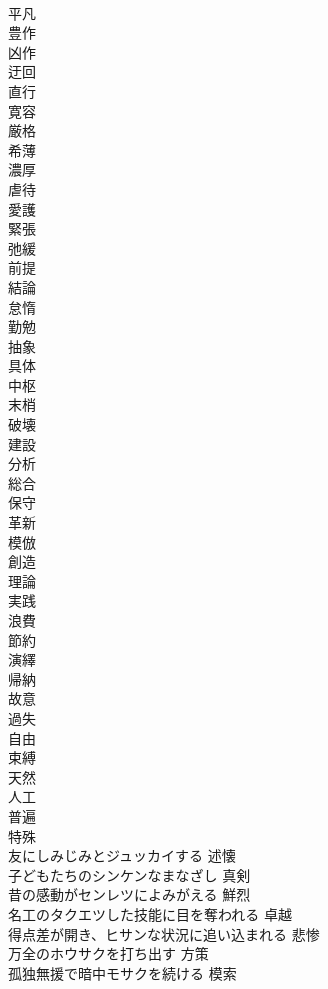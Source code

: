 \documentclass[8pt]{extreport}
\begin{document}
\begin{CJK}{UTF8}{min}
\\	平凡
\\	豊作
\\	凶作
\\	迂回
\\	直行
\\	寛容
\\	厳格
\\	希薄
\\	濃厚
\\	虐待
\\	愛護
\\	緊張
\\	弛緩
\\	前提
\\	結論
\\	怠惰
\\	勤勉
\\	抽象
\\	具体
\\	中枢
\\	末梢
\\	破壊
\\	建設
\\	分析
\\	総合
\\	保守
\\	革新
\\	模倣
\\	創造
\\	理論
\\	実践
\\	浪費
\\	節約
\\	演繹
\\	帰納
\\	故意
\\	過失
\\	自由
\\	束縛
\\	天然
\\	人工
\\	普遍
\\	特殊
\\	友にしみじみとジュッカイする	述懐
\\	子どもたちのシンケンなまなざし	真剣
\\	昔の感動がセンレツによみがえる	鮮烈
\\	名工のタクエツした技能に目を奪われる	卓越
\\	得点差が開き、ヒサンな状況に追い込まれる	悲惨
\\	万全のホウサクを打ち出す	方策
\\	孤独無援で暗中モサクを続ける	模索

\end{CJK}
\end{document}
